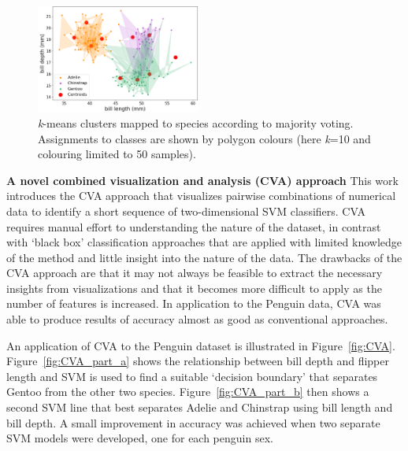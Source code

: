 \documentclass[12pt]{article}
\begin{document}
\begin{figure} %
  \centering
  \vspace{-0.5\baselineskip} %
  \includegraphics[width=0.48\textwidth]{kmeansmap.png} %
  \vspace{-0.5\baselineskip} %
  \caption{\textit{k}-means clusters mapped to species according to majority voting. 
  Assignments to classes are shown by polygon colours (here \textit{k}=10 and colouring limited to 50 samples).}
  \vspace{-0.5\baselineskip} %
  \label{fig:kmeansmap}
\end{figure}

\textbf{A novel combined visualization and analysis (CVA) approach}  
This work introduces the CVA approach that visualizes pairwise combinations of numerical data 
to identify a short sequence of two-dimensional SVM classifiers. 
CVA requires manual effort to understanding the nature of the dataset, 
in contrast with `black box' classification approaches that are applied with limited knowledge 
of the method and little insight into the nature of the data. 
The drawbacks of the CVA approach are that it may not always be feasible to extract the necessary insights 
from visualizations and that it becomes more difficult to apply as the number of features is increased. 
In application to the Penguin data, CVA was able to produce results of accuracy almost as good 
as conventional approaches.

An application of CVA to the Penguin dataset is illustrated in Figure~\ref{fig:CVA}. 
Figure~\ref{fig:CVA_part_a} shows the relationship between bill depth and flipper length and 
SVM is used to find a suitable `decision boundary' that separates Gentoo from the other two species. 
Figure~\ref{fig:CVA_part_b} then shows a second SVM line that best separates Adelie and Chinstrap using bill length and bill depth. 
A small improvement in accuracy was achieved when two separate SVM models were developed, one for each penguin sex.
\end{document}
